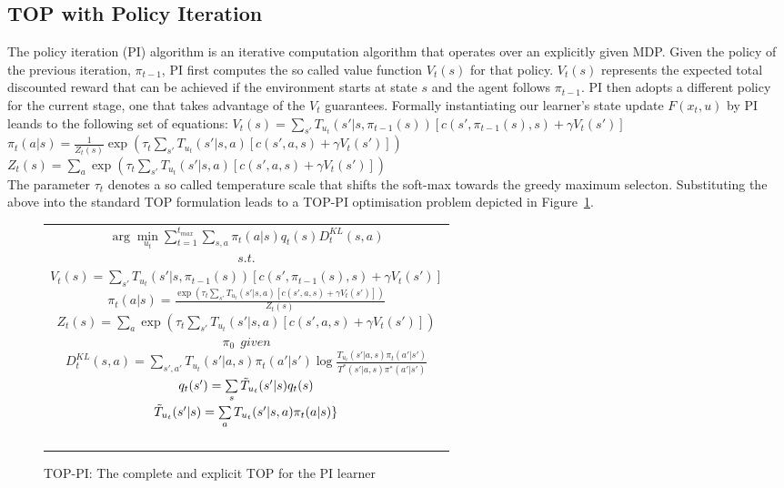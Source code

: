 \documentclass[letterpaper]{aamas2009}
\begin{document}
\subsection{TOP with Policy Iteration}
The policy iteration (PI) algorithm is an iterative computation
algorithm that operates over an explicitly given MDP. Given the policy
of the previous iteration, $\pi_{t-1}$, PI first computes the so
called value function $V_t(s)$ for that policy. $V_t(s)$ represents
the expected total discounted reward that can be achieved if the
environment starts at state $s$ and the agent follows $\pi_{t-1}$. PI
then adopts a different policy for the current stage, one that takes
advantage of the $V_t$ guarantees. Formally instantiating our
learner's state update $F(x_t,u)$ by PI leands to the following set of
equations:
{\center 
$V_t(s)=\sum\limits_{s'}T_{u_t}(s'|s,\pi_{t-1}(s))\left[
c(s',\pi_{t-1}(s),s)+\gamma V_t(s')
\right]$\\
$\pi_t(a|s)=\frac{1}{Z_t(s)}\exp\left(\tau_t\sum\limits_{s'}T_{u_t}(s'|s,a)\left[
c(s',a,s)+\gamma V_t(s')
\right]\right)$\\
$Z_t(s)=\sum\limits_a\exp\left(\tau_t\sum\limits_{s'}T_{u_t}(s'|s,a)\left[
c(s',a,s)+\gamma V_t(s')
\right]\right)$\\
}
The parameter $\tau_t$ denotes a so called temperature scale that
shifts the soft-max towards the greedy maximum selecton. Substituting
the above into the standard TOP formulation leads to a TOP-PI
optimisation problem depicted in Figure~\ref{t_opt_PI}.
\begin{figure}[th]
\begin{tabular}{|c|} \hline \parbox{3.2 in} {\center 
$\arg\min\limits_{u_t}\sum\limits_{t=1}^{t_{max}}\sum\limits_{s,a}\pi_t(a|s)q_t(s)D^{KL}_t(s,a)$\\
$s.t.$\\
$V_t(s)=\sum\limits_{s'}T_{u_t}(s'|s,\pi_{t-1}(s))\left[
c(s',\pi_{t-1}(s),s)+\gamma V_t(s')
\right]$\\
$\pi_t(a|s)=\frac{\exp\left(\tau_t\sum\limits_{s'}T_{u_t}(s'|s,a)\left[
c(s',a,s)+\gamma V_t(s')
\right]\right)}{Z_t(s)}$\\
$Z_t(s)=\sum\limits_a\exp\left(\tau_t\sum\limits_{s'}T_{u_t}(s'|s,a)\left[
c(s',a,s)+\gamma V_t(s')
\right]\right)$\\
$\pi_0\ \ \displaystyle{given}$\\
$D^{KL}_t(s,a)=\sum\limits_{s',a'}T_{u_t}(s'|a,s)\pi_t(a'|s')\log\frac{T_{u_t}(s'|a,s)\pi_t(a'|s')}{T^*(s'|a,s)\pi^*(a'|s')}$\\
$q_t(s')=\sum\limits_s\Tilde{T}_{u_t}(s'|s)q_t(s)$\\
$\Tilde{T}_{u_t}(s'|s)=\sum\limits_aT_{u_t}(s'|s,a)\pi_t(a|s)\}$\\\ \\
}\\ \hline \end{tabular}
\caption{\label{t_opt_PI}TOP-PI: The complete and explicit TOP for the
  PI learner}
\end{figure}
\end{document}
